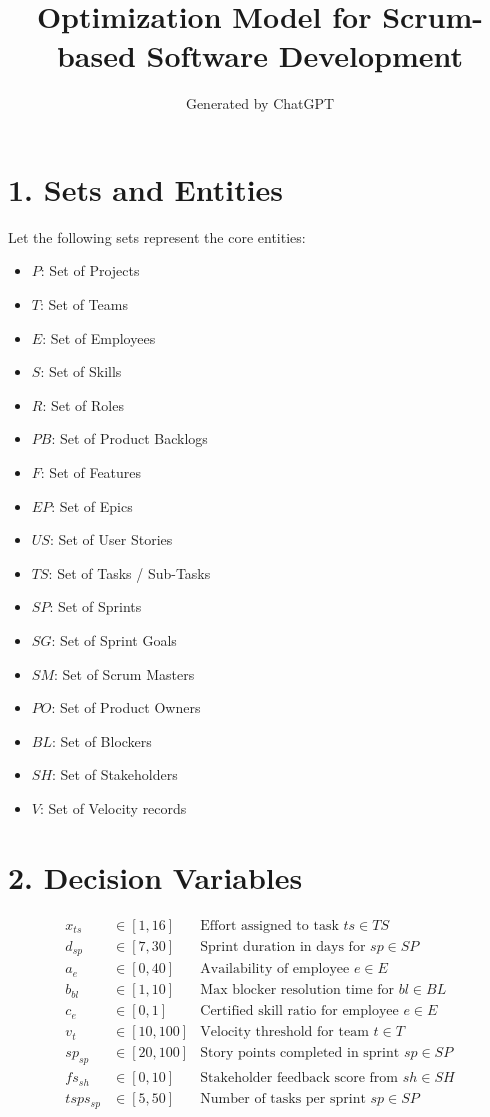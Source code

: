 \documentclass{article}
\title{Optimization Model for Scrum-based Software Development}
\author{Generated by ChatGPT}
\date{}
\begin{document}
\maketitle

\section*{1. Sets and Entities}

Let the following sets represent the core entities:

\begin{itemize}
  \item $P$: Set of Projects
  \item $T$: Set of Teams
  \item $E$: Set of Employees
  \item $S$: Set of Skills
  \item $R$: Set of Roles
  \item $PB$: Set of Product Backlogs
  \item $F$: Set of Features
  \item $EP$: Set of Epics
  \item $US$: Set of User Stories
  \item $TS$: Set of Tasks / Sub-Tasks
  \item $SP$: Set of Sprints
  \item $SG$: Set of Sprint Goals
  \item $SM$: Set of Scrum Masters
  \item $PO$: Set of Product Owners
  \item $BL$: Set of Blockers
  \item $SH$: Set of Stakeholders
  \item $V$: Set of Velocity records
\end{itemize}

\section*{2. Decision Variables}

\begin{align*}
x_{ts} &\in [1, 16] & \text{Effort assigned to task } ts \in TS \\
d_{sp} &\in [7, 30] & \text{Sprint duration in days for } sp \in SP \\
a_{e} &\in [0, 40] & \text{Availability of employee } e \in E \\
b_{bl} &\in [1, 10] & \text{Max blocker resolution time for } bl \in BL \\
c_{e} &\in [0, 1] & \text{Certified skill ratio for employee } e \in E \\
v_{t} &\in [10, 100] & \text{Velocity threshold for team } t \in T \\
sp_{sp} &\in [20, 100] & \text{Story points completed in sprint } sp \in SP \\
fs_{sh} &\in [0, 10] & \text{Stakeholder feedback score from } sh \in SH \\
tsps_{sp} &\in [5, 50] & \text{Number of tasks per sprint } sp \in SP
\end{align*}
\end{document}
